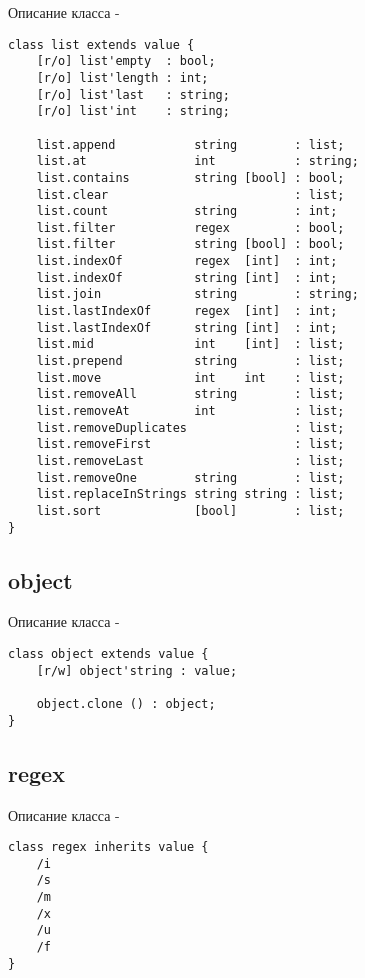 \noindent Описание класса \listtype -
\begin{lstlisting}[numbers=none]
class list extends value {
    [r/o] list'empty  : bool;
    [r/o] list'length : int;
    [r/o] list'last   : string;
    [r/o] list'int    : string;

    list.append           string        : list;
    list.at               int           : string;
    list.contains         string [bool] : bool;
    list.clear                          : list;
    list.count            string        : int;
    list.filter           regex         : bool;
    list.filter           string [bool] : bool;
    list.indexOf          regex  [int]  : int;
    list.indexOf          string [int]  : int;
    list.join             string        : string;
    list.lastIndexOf      regex  [int]  : int;
    list.lastIndexOf      string [int]  : int;
    list.mid              int    [int]  : list;
    list.prepend          string        : list;
    list.move             int    int    : list;
    list.removeAll        string        : list;
    list.removeAt         int           : list;
    list.removeDuplicates               : list;
    list.removeFirst                    : list;
    list.removeLast                     : list;
    list.removeOne        string        : list;
    list.replaceInStrings string string : list;
    list.sort             [bool]        : list;
}
\end{lstlisting}

\subsection{{\color{lightblue} object}}

\noindent Описание класса \object -
\begin{lstlisting}[numbers=none]
class object extends value {
    [r/w] object'string : value;
    
    object.clone () : object;
}
\end{lstlisting}

\subsection{{\color{lightblue} regex}}

\noindent Описание класса \regex -
\begin{lstlisting}[numbers=none]
class regex inherits value {
    /i
    /s
    /m
    /x
    /u
    /f
}
\end{lstlisting}

